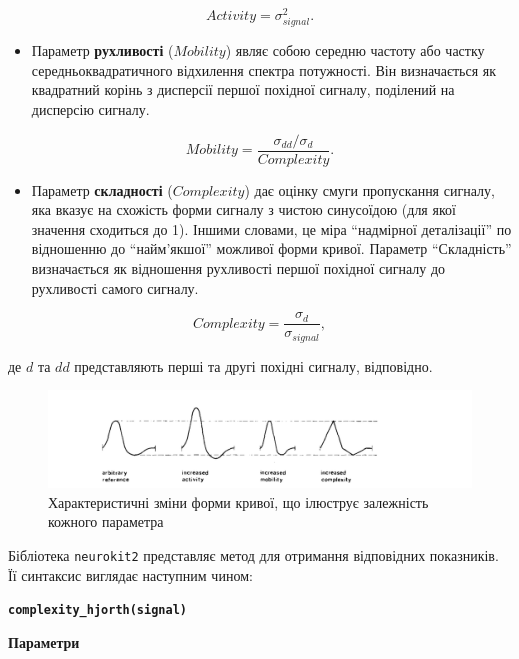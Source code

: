 \documentclass[
  letterpaper,
]{report}
\providecommand{\tightlist}{%
  \setlength{\itemsep}{0pt}\setlength{\parskip}{0pt}}\usepackage{longtable,booktabs,array}
\begin{document}
\[
Activity = \sigma^{2}_{signal}.
\]

\begin{itemize}
\tightlist
\item
  Параметр \textbf{рухливості} (\(Mobility\)) являє собою середню
  частоту або частку середньоквадратичного відхилення спектра
  потужності. Він визначається як квадратний корінь з дисперсії першої
  похідної сигналу, поділений на дисперсію сигналу.
\end{itemize}

\[
Mobility = \frac{\sigma_{dd}/\sigma_{d}}{Complexity}. 
\]

\begin{itemize}
\tightlist
\item
  Параметр \textbf{складності} (\(Complexity\)) дає оцінку смуги
  пропускання сигналу, яка вказує на схожість форми сигналу з чистою
  синусоїдою (для якої значення сходиться до 1). Іншими словами, це міра
  ``надмірної деталізації'' по відношенню до ``найм'якшої'' можливої
  форми кривої. Параметр ``Складність'' визначається як відношення
  рухливості першої похідної сигналу до рухливості самого сигналу.
\end{itemize}

\[
Complexity = \frac{\sigma_d}{\sigma_{signal}}, 
\]

де \(d\) та \(dd\) представляють перші та другі похідні сигналу,
відповідно.

\begin{figure}

{\centering 

\includegraphics{Images/lab_4/hjorth1970.png}

}

\caption{\label{fig-Hjorth}Характеристичні зміни форми кривої, що
ілюструє залежність кожного параметра}

\end{figure}

Бібліотека \texttt{neurokit2} представляє метод для отримання
відповідних показників. Її синтаксис виглядає наступним чином:

\textbf{\texttt{complexity\_hjorth(signal)}}

\textbf{Параметри}
\end{document}
